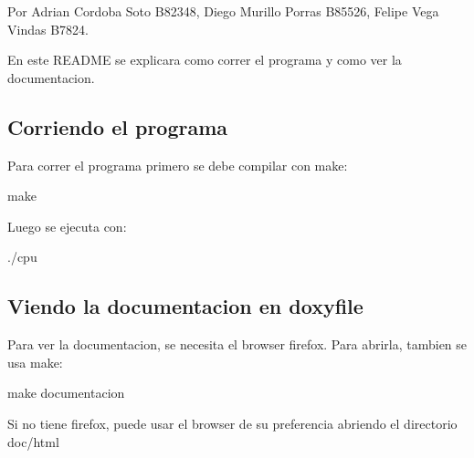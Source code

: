 Por Adrian Cordoba Soto B82348, Diego Murillo Porras B85526, Felipe Vega Vindas B7824.

En este R\+E\+A\+D\+ME se explicara como correr el programa y como ver la documentacion.

\subsection*{Corriendo el programa}

Para correr el programa primero se debe compilar con {\ttfamily make}\+: 
\begin{DoxyCode}
make
\end{DoxyCode}
 Luego se ejecuta con\+: 
\begin{DoxyCode}
./cpu
\end{DoxyCode}


\subsection*{Viendo la documentacion en doxyfile}

Para ver la documentacion, se necesita el browser firefox. Para abrirla, tambien se usa {\ttfamily make}\+: 
\begin{DoxyCode}
make documentacion
\end{DoxyCode}
 Si no tiene firefox, puede usar el browser de su preferencia abriendo el directorio {\ttfamily doc/html} 